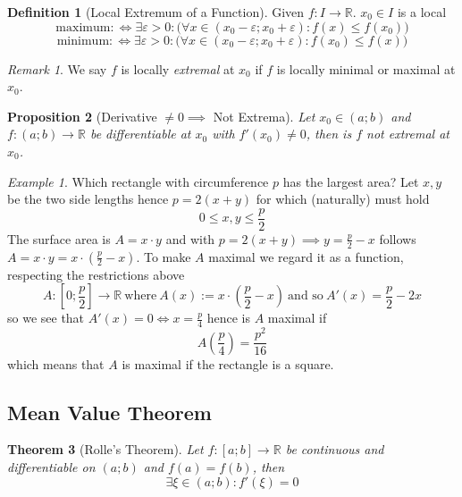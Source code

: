 \documentclass[english,titlepage]{uzhpub}
\theoremstyle{definition}
\newtheorem{definition}{Definition}[section]
\theoremstyle{plain}
\newtheorem{proposition}[definition]{Proposition}
\newtheorem{theorem}[definition]{Theorem} %
\theoremstyle{remark}
\newtheorem*{remark}{Remark}
\theoremstyle{example}
\newtheorem*{example}{Example}
\begin{document}
   \begin{definition}[Local Extremum of a Function]
      Given \(f: I \to \mathbb{R}\). \(x_0 \in I\) is a local
      \[\text{maximum} :\iff \exists \varepsilon > 0: \big(\forall x \in (x_0 - \varepsilon; x_0 + \varepsilon): f(x) \leq f(x_0)\big)\]
      \[\text{minimum} :\iff \exists \varepsilon > 0: \big(\forall x \in (x_0 - \varepsilon; x_0 + \varepsilon): f(x_0) \leq f(x)\big)\]
   \end{definition}
   \begin{remark}
      We say \(f\) is locally \textit{extremal} at \(x_0\) if \(f\) is locally minimal or maximal at \(x_0\).
   \end{remark}

   \begin{proposition}[Derivative \(\neq 0 \implies\) Not Extrema]\label{pro:diff=0_not_extreme}
      Let \(x_0 \in (a;b)\) and \(f: (a;b) \to \mathbb{R}\) be differentiable at \(x_0\) with \(f'(x_0) \neq 0\), then is \(f\) not extremal at \(x_0\).
   \end{proposition}
   \begin{example}
      Which rectangle with circumference \(p\) has the largest area?
      Let \(x, y\) be the two side lengths hence \(p = 2 (x + y)\) for which (naturally) must hold
      \[0 \leq x, y \leq \frac{p}{2}\]
      The surface area is \(A = x \cdot y\) and with \(p = 2 (x + y) \implies y = \frac{p}{2} - x\) follows \(A = x \cdot y = x \cdot \left(\frac{p}{2} - x\right)\).
      To make \(A\) maximal we regard it as a function, respecting the restrictions above
      \[A: \left[0; \frac{p}{2}\right] \to \mathbb{R}~\text{where}~A(x) := x \cdot \left(\frac{p}{2} - x\right)~\text{and so}~A'(x) = \frac{p}{2} - 2x\]
      so we see that \(A'(x) = 0 \iff x = \frac{p}{4}\) hence is \(A\) maximal if
      \[A\left(\frac{p}{4}\right) = \frac{p^2}{16}\]
      which means that \(A\) is maximal if the rectangle is a square.
   \end{example}

   \subsection{Mean Value Theorem}
   \begin{theorem}[Rolle's Theorem]\label{thm:rolles_thm}
      Let \(f: [a; b] \to \mathbb{R}\) be continuous and differentiable on \((a; b)\) and \(f(a) = f(b)\), then
      \[\exists \xi \in (a; b): f'(\xi) = 0\]
   \end{theorem}
\end{document}
